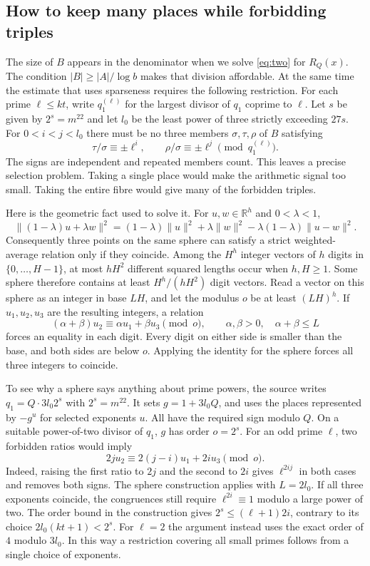 \documentclass[11pt,letterpaper]{article}
\begin{document}
\subsection{How to keep many places while forbidding triples}

The size of \(B\) appears in the denominator when we solve \eqref{eq:two} for \(R_Q(x)\). The condition \(|B|\ge |A|/\log b\) makes that division affordable. At the same time the estimate that uses sparseness requires the following restriction. For each prime \(\ell\le kt\), write \(q_1^{(\ell)}\) for the largest divisor of \(q_1\) coprime to \(\ell\). Let \(s\) be given by \(2^s=m^{22}\) and let \(l_0\) be the least power of three strictly exceeding \(27s\). For \(0<i<j<l_0\) there must be no three members \(\sigma,\tau,\rho\) of \(B\) satisfying
\[
     \tau/\sigma\equiv\pm\ell^i,\qquad
     \rho/\sigma\equiv\pm\ell^j\pmod {q_1^{(\ell)}} .
\]
The signs are independent and repeated members count. This leaves a precise selection problem. Taking a single place would make the arithmetic signal too small. Taking the entire fibre would give many of the forbidden triples.

Here is the geometric fact used to solve it. For \(u,w\in\mathbb R^h\) and \(0<\lambda<1\),
\[
 \|(1-\lambda)u+\lambda w\|^2=(1-\lambda)\|u\|^2+\lambda\|w\|^2
                    -\lambda(1-\lambda)\|u-w\|^2.
\]
Consequently three points on the same sphere can satisfy a strict weighted-average relation only if they coincide. Among the \(H^h\) integer vectors of \(h\) digits in \(\{0,\ldots,H-1\}\), at most \(hH^2\) different squared lengths occur when \(h,H\ge1\). Some sphere therefore contains at least \(H^h/(hH^2)\) digit vectors. Read a vector on this sphere as an integer in base \(LH\), and let the modulus \(o\) be at least \((LH)^h\). If \(u_1,u_2,u_3\) are the resulting integers, a relation
\[
 (\alpha+\beta)u_2\equiv\alpha u_1+\beta u_3\pmod o,
 \qquad \alpha,\beta>0,\quad \alpha+\beta\le L
\]
forces an equality in each digit. Every digit on either side is smaller than the base, and both sides are below \(o\). Applying the identity for the sphere forces all three integers to coincide.

To see why a sphere says anything about prime powers, the source writes \(q_1=Q\cdot3l_0 2^s\) with \(2^s=m^{22}\). It sets \(g=1+3l_0 Q\), and uses the places represented by \(-g^u\) for selected exponents \(u\). All have the required sign modulo \(Q\). On a suitable power-of-two divisor of \(q_1\), \(g\) has order \(o=2^s\). For an odd prime \(\ell\), two forbidden ratios would imply
\[
       2j u_2\equiv 2(j-i)u_1+2i u_3\pmod o.
\]
Indeed, raising the first ratio to \(2j\) and the second to \(2i\) gives \(\ell^{2ij}\) in both cases and removes both signs. The sphere construction applies with \(L=2l_0\). If all three exponents coincide, the congruences still require \(\ell^{2i}\equiv1\) modulo a large power of two. The order bound in the construction gives \(2^s\le(\ell+1)2i\), contrary to its choice \(2l_0(kt+1)<2^s\). For \(\ell=2\) the argument instead uses the exact order of \(4\) modulo \(3l_0\). In this way a restriction covering all small primes follows from a single choice of exponents.
\end{document}
